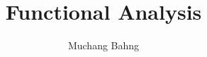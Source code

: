 \documentclass{article}
\begin{document}
\title{Functional Analysis}
\author{Muchang Bahng}
\date{}

\maketitle
\tableofcontents
\pagebreak





\end{document}
